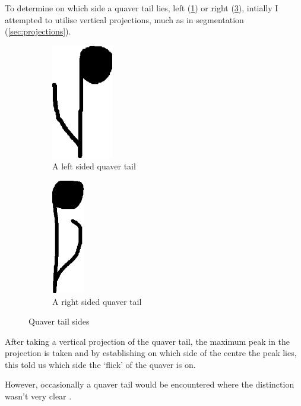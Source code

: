 To determine on which side a quaver tail lies, left (\cref{fig:quaver-tail-left}) or right (\cref{fig:quaver-tail-right}), intially I attempted to utilise vertical projections, much as in segmentation (\cref{sec:projections}).

\begin{figure}[h!]
    \centering

    \begin{subfigure}[b]{.45\linewidth}
        \centering
      \includegraphics[height=5cm]{gfx/techniques/quaver-left-6087.png}
      \caption{A left sided quaver tail}
      \label{fig:quaver-tail-left}
    \end{subfigure}
    \begin{subfigure}[b]{.45\linewidth}
        \centering
      \includegraphics[height=5cm]{gfx/techniques/quaver-right-3083.png}
      \caption{A right sided quaver tail}
      \label{fig:quaver-tail-right}
    \end{subfigure}
    
    \caption{Quaver tail sides}
\end{figure}

After taking a vertical projection of the quaver tail, the maximum peak in the projection is taken and by establishing on which side of the centre the peak lies, this told us which side the `flick' of the quaver is on.

However, occasionally a quaver tail would be encountered where the distinction wasn't very clear .

